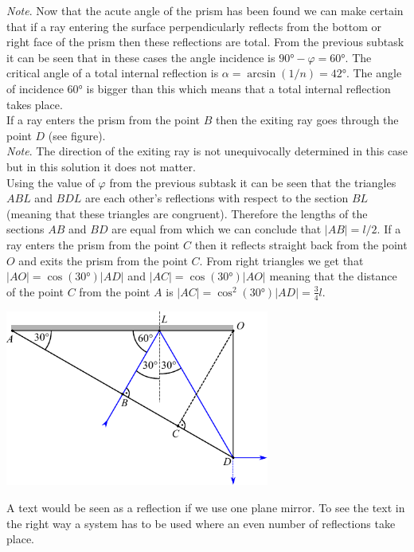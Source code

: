 \emph{Note}. Now that the acute angle of the prism has been found we can make certain that if a ray entering the surface perpendicularly reflects from the bottom or right face of the prism then these reflections are total. From the previous subtask it can be seen that in these cases the angle incidence is $\ang{90}-\varphi=\ang{60}$. The critical angle of a total internal reflection is $\alpha=\arcsin(1/n)=\ang{42}$. The angle of incidence $\ang{60}$ is bigger than this which means that a total internal reflection takes place.\\
\osa If a ray enters the prism from the point $B$ then the exiting ray goes through the point $D$ (see figure). \\
\emph{Note}. The direction of the exiting ray is not unequivocally determined in this case but in this solution it does not matter.\\
Using the value of $\varphi$ from the previous subtask it can be seen that the triangles $ABL$ and $BDL$ are each other’s reflections with respect to the section $BL$ (meaning that these triangles are congruent). Therefore the lengths of the sections $AB$ and $BD$ are equal from which we can conclude that $|AB|=l/2$. If a ray enters the prism from the point $C$ then it reflects straight back from the point $O$ and exits the prism from the point $C$. From right triangles we get that $|AO|=\cos(\ang{30})|AD|$ and $|AC|=\cos(\ang{30})|AO|$ meaning that the distance of the point $C$ from the point $A$ is $|AC|=\cos^2(\ang{30})|AD|=\frac{3}{4}l$. 
\begin{center}
  \includegraphics[width=0.65\textwidth]{2014-v3g-04-periskoopprillid_lahendus_joonis3}
\end{center}
\osa A text would be seen as a reflection if we use one plane mirror. To see the text in the right way a system has to be used where an even number of reflections take place.
\probend